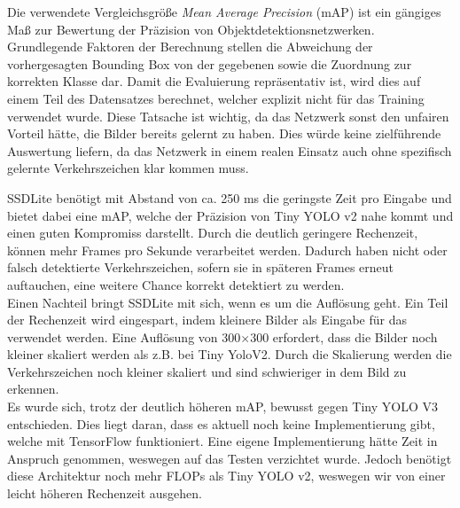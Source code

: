 \documentclass[12pt,a4paper,ngerman,enabledeprecatedfontcommands]{scrreprt}
\begin{document}
Die verwendete Vergleichsgröße \textit{Mean Average Precision} (mAP) ist ein gängiges Maß zur Bewertung der Präzision von Objektdetektionsnetzwerken. Grundlegende Faktoren der Berechnung stellen die Abweichung der vorhergesagten Bounding Box von der gegebenen sowie die Zuordnung zur korrekten Klasse dar. Damit die Evaluierung repräsentativ ist, wird dies auf einem Teil des Datensatzes berechnet, welcher explizit nicht für das Training verwendet wurde.
Diese Tatsache ist wichtig, da das Netzwerk sonst den unfairen Vorteil hätte, die Bilder bereits gelernt zu haben. Dies würde keine zielführende Auswertung liefern, da das Netzwerk in einem realen Einsatz auch ohne spezifisch gelernte Verkehrszeichen klar kommen muss.\\


SSDLite\cite{DBLP:journals/corr/abs-1801-04381} benötigt mit Abstand von ca. 250 ms die geringste Zeit pro Eingabe und bietet dabei eine \gls{mAP}, welche der Präzision von Tiny YOLO v2\cite{DBLP:journals/corr/RedmonF16} nahe kommt und einen guten Kompromiss darstellt. Durch die deutlich geringere Rechenzeit, können mehr Frames pro Sekunde verarbeitet werden. Dadurch haben nicht oder falsch detektierte Verkehrszeichen, sofern sie in späteren Frames erneut auftauchen, eine weitere Chance korrekt detektiert zu werden.\\
Einen Nachteil bringt SSDLite\cite{DBLP:journals/corr/abs-1801-04381} mit sich, wenn es um die Auflösung geht. Ein Teil der Rechenzeit wird eingespart, indem kleinere Bilder als Eingabe für das  verwendet werden.
Eine Auflösung von 300$\times$300 erfordert, dass die Bilder noch kleiner skaliert werden als z.B. bei Tiny YoloV2\cite{DBLP:journals/corr/RedmonF16}.
Durch die Skalierung werden die Verkehrszeichen noch kleiner skaliert und sind schwieriger in dem Bild zu erkennen.\\
Es wurde sich, trotz der deutlich höheren \gls{mAP}, bewusst gegen Tiny YOLO V3\cite{DBLP:journals/corr/abs-1804-02767} entschieden.
Dies liegt daran, dass es aktuell noch keine Implementierung gibt, welche mit TensorFlow funktioniert.
Eine eigene Implementierung hätte Zeit in Anspruch genommen, weswegen auf das Testen verzichtet wurde.
Jedoch benötigt diese Architektur noch mehr FLOPs als Tiny YOLO v2\cite{DBLP:journals/corr/RedmonF16}, weswegen wir von einer leicht höheren Rechenzeit ausgehen.
\end{document}
